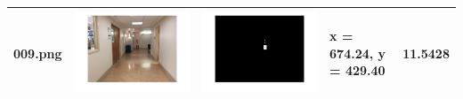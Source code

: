 \documentclass[fleqn,10pt]{SelfArx} %
\begin{document}
\begin{table}
\begin{tabular}{>{\centering\arraybackslash}M{15mm}cc>{\centering\arraybackslash}M{11mm}>{\centering\arraybackslash}M{15mm}}
\vspace{-4cm}009.png & \includegraphics[trim={3cm 2cm 3cm 2cm},clip,scale=0.28]{results/009.jpg} & \includegraphics[trim={3cm 2cm 3cm 2cm},clip,scale=0.28]{results/009s.jpg} & \vspace{-4cm} x = 674.24, y = 429.40 & \vspace{-4cm}11.5428 \\ 
\hline 

\end{tabular}
\end{table}
\end{document}
